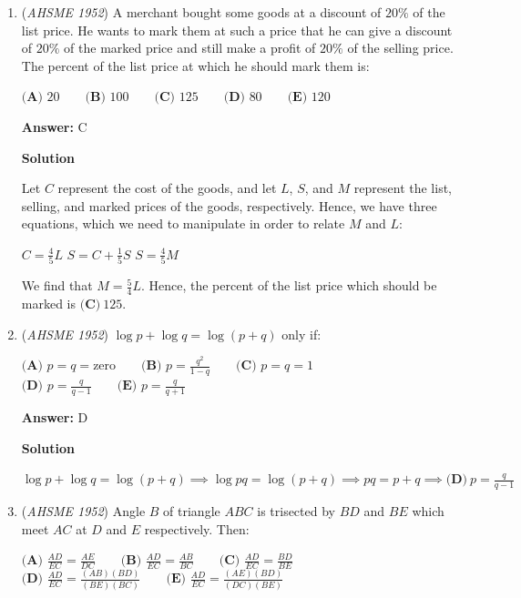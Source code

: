 \begin{enumerate}
\textbf{Solution}

$b\cdot a=\frac{11}{10}b\cdot xa\implies x=\frac{10}{11}$. Hence, the altitude is decreased by $1-x=\frac{1}{11}=\boxed{\textbf{(E)}\ 9\frac{1}{11}\%}$.

 


	\item (\textit{AHSME 1952}) A merchant bought some goods at a discount of $20\%$ of the list price. He wants to mark them at such a price that he can give a discount of $20\%$ of the marked price and still make a profit of $20\%$ of the selling price. The percent of the list price at which he should mark them is:


 $\textbf{(A) \ }20  \qquad \textbf{(B) \ }100 \qquad \textbf{(C) \ }125 \qquad \textbf{(D) \ }80 \qquad \textbf{(E) \ }120$

 \textbf{Answer: }C



\textbf{Solution}

Let $C$ represent the cost of the goods, and let $L$, $S$, and $M$ represent the list, selling, and marked prices of the goods, respectively. Hence, we have three equations, which we need to manipulate in order to relate $M$ and $L$:

 $C=\frac{4}{5}L$
$S=C+\frac{1}{5}S$
$S=\frac{4}{5}M$

 We find that $M=\frac{5}{4}L$. Hence, the percent of the list price which should be marked is $\boxed{\textbf{(C)}\ 125}$.

 


	\item (\textit{AHSME 1952}) $\log p+\log q=\log(p+q)$ only if:


 $\textbf{(A) \ }p=q=\text{zero}  \qquad \textbf{(B) \ }p=\frac{q^2}{1-q} \qquad \textbf{(C) \ }p=q=1 \qquad$
$\textbf{(D) \ }p=\frac{q}{q-1} \qquad \textbf{(E) \ }p=\frac{q}{q+1}$

 \textbf{Answer: }D



\textbf{Solution}

$\log p+\log q=\log(p+q)\implies \log pq=\log(p+q)\implies pq=p+q\implies \boxed{\textbf{(D)}\ p=\frac{q}{q-1}}$



	\item (\textit{AHSME 1952}) Angle $B$ of triangle $ABC$ is trisected by $BD$ and $BE$ which meet $AC$ at $D$ and $E$ respectively. Then:


 $\textbf{(A) \ }\frac{AD}{EC}=\frac{AE}{DC}  \qquad \textbf{(B) \ }\frac{AD}{EC}=\frac{AB}{BC} \qquad \textbf{(C) \ }\frac{AD}{EC}=\frac{BD}{BE} \qquad$
$\textbf{(D) \ }\frac{AD}{EC}=\frac{(AB)(BD)}{(BE)(BC)} \qquad \textbf{(E) \ }\frac{AD}{EC}=\frac{(AE)(BD)}{(DC)(BE)}$


\end{enumerate}
